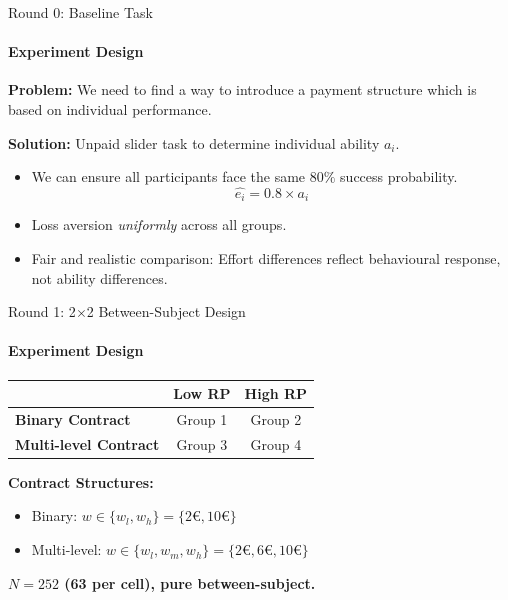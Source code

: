 \documentclass{beamer}
\begin{document}
\begin{frame}{Round 0: Baseline Task}
\framesubtitle{Experiment Design}

    \textbf{Problem:} We need to find a way to introduce a payment structure which is based on individual performance.

    \medskip
    
    \textbf{Solution:} Unpaid slider task to determine individual ability  $a_i$.
    
    \begin{itemize}
      \item We can ensure all participants face the same $80\%$ success probability. \\
      $$\hat{e_i} = 0.8 \times a_i$$
      \item Loss aversion \textit{uniformly} across all groups.
      \item Fair and realistic comparison: Effort differences reflect behavioural response, 
            not ability differences.
    \end{itemize}

\end{frame}

\begin{frame}{Round 1: 2$\times$2 Between-Subject Design}
\framesubtitle{Experiment Design}

\begin{table}[]
\centering
\begin{tabular}{l|c|c}
 & \textbf{Low RP} & \textbf{High RP} \\ \hline
\textbf{Binary Contract} & Group 1 & Group 2 \\ \hline
\textbf{Multi-level Contract} & Group 3 & Group 4 \\
\end{tabular}
\end{table}

\vspace{0.4cm}

\textbf{Contract Structures:}
\begin{itemize}
    \item Binary: $w \in \{w_l, w_h\} = \{2\text{€}, 10\text{€}\}$
    \item Multi-level: $w \in \{w_l, w_m, w_h\} = \{2\text{€}, 6\text{€}, 10\text{€}\}$
\end{itemize}

\vspace{0.3cm}
\centering
\textbf{$N = 252$ (63 per cell), pure between-subject.}

\end{frame}
\end{document}
